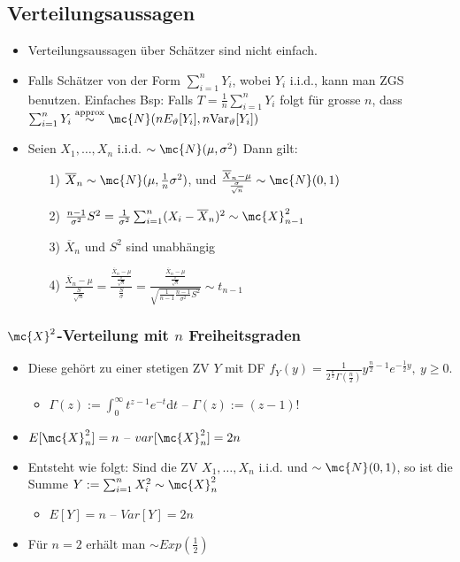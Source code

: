 \subsection{Verteilungsaussagen}
\begin{itemize}
    \item Verteilungsaussagen über Schätzer sind nicht einfach.
    \item Falls Schätzer von der Form $\sum_{i=1}^{n} Y_i$, wobei $Y_i$ i.i.d., kann man ZGS benutzen. Einfaches Bsp: Falls $T = \frac{1}{n} \sum_{i=1}^{n} Y_i$ folgt für grosse $n$, dass $\sum_{i=1}^{n} Y_i \overset{\text{approx}}{\sim} \mc{N}(n E_\vartheta[Y_i], n \text{Var}_\vartheta[Y_i])$
    \item Seien $X_1, \dots, X_n$ i.i.d. $\sim \mc{N}(\mu, \sigma^2)$ Dann gilt:
        \begin{itemize}
            \item[1)] $\overline{X}_n \sim \mc{N}(\mu, \frac{1}{n} \sigma^2)$, und $\frac{\overline{X}_n - \mu}{\frac{\sigma}{\sqrt{n}}} \sim \mc{N}(0, 1)$
            \item[2)] $\frac{n - 1}{\sigma^2}S^2 = \frac{1}{\sigma^2}\sum_{i=1}^{n} (X_i - \overline{X}_n)^2 \sim \mc{X}^2_{n - 1}$
            \item[3)] $\overline{X}_n$ und $S^2$ sind unabhängig
            \item[4)] $\frac{\overline{X}_n - \mu}{\frac{S}{\sqrt{n}}} = \frac{\frac{\overline{X}_n - \mu}{\frac{\sigma}{\sqrt{n}}}}{\frac{S}{\sigma}} = \frac{\frac{\overline{X}_n - \mu}{\frac{\sigma}{\sqrt{n}}}}{\sqrt{\frac{1}{n - 1}\frac{n - 1}{\sigma^2}S^2}} \sim t_{n-1}$
        \end{itemize}
\end{itemize}

\subsubsection{$\mc{X}^2$-Verteilung mit $n$ Freiheitsgraden}
\begin{itemize}
    \item Diese gehört zu einer stetigen ZV $Y$ mit DF $f_Y(y) = \frac{1}{2^{\frac{n}{2}} \Gamma(\frac{n}{2})}y^{\frac{n}{2} - 1}e^{-\frac{1}{2}y}, \ y \ge 0$.
        \begin{itemize}
            \item $\Gamma(z) := \int_{0}^{\infty} t^{z - 1} e^{-t}\mathrm{d}t$  \quad -- $\Gamma(z) := (z - 1)!$
        \end{itemize}
    \item $E[\mc{X}_n^2] = n$ \quad -- $var[\mc{X}_n^2] = 2n$
    \item Entsteht wie folgt: Sind die ZV $X_1, \dots, X_n$ i.i.d. und $\sim \mc{N}(0, 1)$, so ist die Summe $Y := \sum_{i=1}^{n} X_i^2 \sim \mc{X}_n^2$
        \begin{itemize}
            \item $E[Y] = n$ \quad -- $Var[Y] = 2n$
        \end{itemize}
    \item Für $n = 2$ erhält man $\sim Exp(\frac{1}{2})$
\end{itemize}

